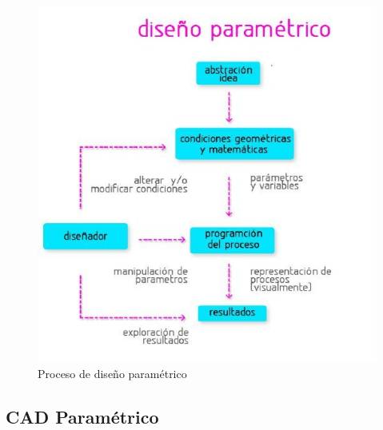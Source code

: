 \begin{figure}
\centering
\includegraphics[width=12cm]{Img/CPD/4-PARAM.jpg}
\caption[(optional short caption)]{\label{us_figure} Proceso de diseño paramétrico }
\end{figure}


\subsection{CAD Paramétrico}


